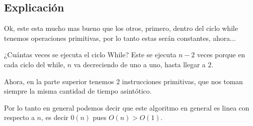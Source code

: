 \documentclass[12pt, fleqn]{article}                            %
\theoremstyle{break}                                            %
\begin{document}
    \subsection{Explicación}

        Ok, este esta mucho mas bueno que los otros, primero, dentro del
        ciclo while tenemos operaciones primitivas, por lo tanto estas serán
        constantes, ahora...

        ¿Cuántas veces se ejecuta el ciclo While? Este se ejecuta $n - 2$ veces 
        porque en cada ciclo del while, $n$ va decreciendo de uno a uno, hasta llegar
        a $2$.

        Ahora, en la parte superior tenemos $2$ instrucciones primitivas, que nos toman
        siempre la misma cantidad de tiempo asintótico.

        Por lo tanto en general podemos decir que este algoritmo en general es linea
        con respecto a $n$, es decir $0(n)$ pues $O(n) > O(1)$.






    \clearpage
\end{document}
